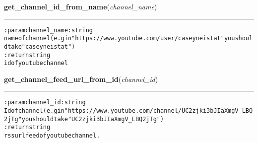     \label{hal:internet:youtube:get_channel_id_from_name}

    \vspace{0.5ex}

\hspace{.8\funcindent}\begin{boxedminipage}{\funcwidth}

    \raggedright \textbf{get\_channel\_id\_from\_name}(\textit{channel\_name})

    \vspace{-1.5ex}

    \rule{\textwidth}{0.5\fboxrule}
\setlength{\parskip}{2ex}
\begin{alltt}

:param channel\_name: string
    name of channel (e.g in "https://www.youtube.com/user/caseyneistat" you should take "caseyneistat")
:return string
    id of youtube channel
\end{alltt}

\setlength{\parskip}{1ex}
    \end{boxedminipage}

    \label{hal:internet:youtube:get_channel_feed_url_from_id}

    \vspace{0.5ex}

\hspace{.8\funcindent}\begin{boxedminipage}{\funcwidth}

    \raggedright \textbf{get\_channel\_feed\_url\_from\_id}(\textit{channel\_id})

    \vspace{-1.5ex}

    \rule{\textwidth}{0.5\fboxrule}
\setlength{\parskip}{2ex}
\begin{alltt}

:param channel\_id: string
    Id of channel (e.g in "https://www.youtube.com/channel/UC2zjki3bJIaXmgV\_LBQ2jTg" you should take "UC2zjki3bJIaXmgV\_LBQ2jTg")
:return string
    rss url feed of youtube channel.
\end{alltt}

\setlength{\parskip}{1ex}
    \end{boxedminipage}

